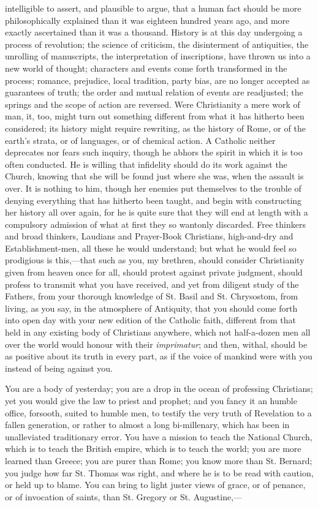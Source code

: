 intelligible to assert, and plausible to argue, that a human fact
should be more philosophically explained than it was eighteen hundred
years ago, and more exactly ascertained than it was a thousand.
History is at this day undergoing a process of revolution; the science
of criticism, the disinterment of antiquities, the unrolling of
manuscripts, the interpretation of inscriptions, have thrown us into a
new world of thought; characters and events come forth transformed in
the process; romance, prejudice, local tradition, party bias, are no
longer accepted as guarantees of truth; the order and mutual relation
of events are readjusted; the springs and the scope of action are
reversed. Were Christianity a mere work of man, it, too, might turn
out something different from what it has hitherto been considered; its
history might require rewriting, as the history of Rome, or of the
earth's strata, or of languages, or of chemical action. A Catholic
neither deprecates nor fears such inquiry, though he abhors the spirit
in which it is too often conducted. He is willing that infidelity
should do its work against the Church, knowing that she will be found
just where she was, when the assault is over. It is nothing to him,
though her enemies put themselves to the trouble of denying everything
that has hitherto been taught, and begin with constructing her history
all over again, for he is quite sure that they will end at length with
a compulsory admission of what at first they so wantonly discarded.
Free thinkers and broad thinkers, Laudians and Prayer-Book Christians,
high-and-dry and Establishment-men, all these he would understand; but
what he would feel so prodigious is this,—that such as you, my
brethren, should consider Christianity given from heaven once for all,
should protest against private judgment, should profess to transmit
what you have received, and yet from diligent study of the Fathers,
from your thorough knowledge of St. Basil and St. Chrysostom, from
living, as you say, in the atmosphere of Antiquity, that you should
come forth into open day with your new edition of the Catholic faith,
different from that held in any existing body of Christians anywhere,
which not half-a-dozen men all over the world would honour with their \emph{imprimatur};
and then, withal, should be as positive about its truth in every part,
as if the voice of mankind were with you instead of being against you.

You are a body of yesterday; you are a drop in the ocean of
professing Christians; yet you would give the law to priest and
prophet; and you fancy it an humble office, forsooth, suited to humble
men, to testify the very truth of Revelation to a fallen generation,
or rather to almost a long bi-millenary, which has been in
unalleviated traditionary error. You have a mission to teach the
National Church, which is to teach the British empire, which is to
teach the world; you are more learned than Greece; you are purer than
Rome; you know more than St. Bernard; you judge how far St. Thomas was
right, and where he is to be read with caution, or held up to blame.
You can bring to light juster views of grace, or of penance, or of
invocation of saints, than St. Gregory or St. Augustine,—

